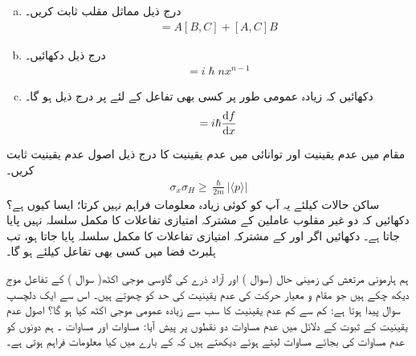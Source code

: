\begin{enumerate}[a.]
\item
 درج ذیل مماثل مقلب ثابت کریں۔
\begin{align}
[ AB,C ] = A[B,C] + [A,C]B
\end{align}
\item
 درج ذیل دکھائیں۔ 
\begin{align*}
[x^{n},p] = i\hslash nx^{n-1}
\end{align*}
\item
 دکھائیں کہ زیادہ عمومی طور پر کسی بھی تفاعل  کے لئے پر درج ذیل ہو گا۔ 
\begin{align}
[f(x) , p] = i\hslash \frac{\dif f}{\dif x}
\end{align}
\end{enumerate}
مقام  میں عدم یقینیت اور توانائی  میں عدم یقینیت کا درج ذیل اصول عدم یقینیت ثابت کریں۔
\begin{align*}
\sigma_{x}\sigma_{H} \geq \frac{\hslash}{2m}|\langle p \rangle |
\end{align*}
ساکن حالات کیلئے یہ آپ کو کوئی زیادہ معلومات فراہم نہیں کرتا؛ ایسا کیوں ہے؟
دکھائیں کہ دو غیر مقلوب عاملین کے مشترکہ امتیازی تفاعلات کا مکمل سلسلہ نہیں پایا جاتا ہے۔
 دکھائیں اگر  اور  کے مشترکہ امتیازی تفاعلات کا مکمل سلسلہ پایا جاتا ہو، تب ہلبرٹ فضا میں کسی بھی تفاعل کیلئے  ہو گا۔


ہم ہارمونی مرتعش کی زمینی حال (سوال ) اور آزاد ذرے کی گاوسی موجی اکٹھ( سوال ) کے تفاعل موج دیکھ چکے ہیں جو مقام و معیار حرکت کی عدم یقینیت کی
 حد  کو چھوتے ہیں۔ اس سے ایک دلچسپ سوال پیدا ہوتا ہے: کم سے کم عدم یقینیت کا سب سے زیادہ عمومی موجی اکٹھ کیا ہو گا؟ اصول عدم یقینیت کے ثبوت کے دلائل میں عدم مساوات دو نقطوں پر پیش آیا: مساوات  اور مساوات ۔ ہم دونوں کو عدم مساوات کی بجائے مساوات لیتے ہوئے دیکھتے ہیں کہ  کے بارے میں کیا معلومات فراہم ہوتی ہے۔
 
